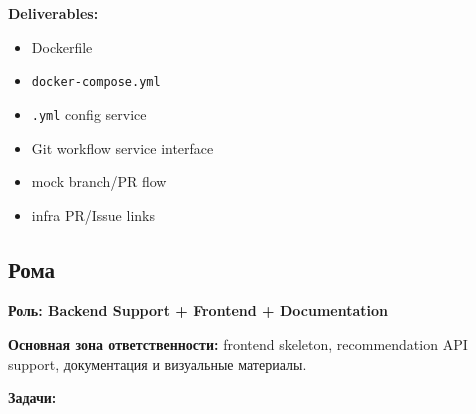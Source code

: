 \documentclass[12pt,a4paper]{article}
\begin{document}
\textbf{Deliverables:}
\begin{itemize}
    \item Dockerfile
    \item \texttt{docker-compose.yml}
    \item \texttt{.yml} config service
    \item Git workflow service interface
    \item mock branch/PR flow
    \item infra PR/Issue links
\end{itemize}

\subsection{Рома}

\textbf{Роль: Backend Support + Frontend + Documentation}

\textbf{Основная зона ответственности:} frontend skeleton, recommendation API support, документация и визуальные материалы.

\textbf{Задачи:}
\end{document}
